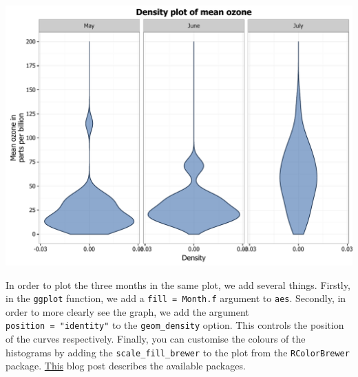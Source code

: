 \documentclass[]{article}
\begin{document}
\begin{center}\includegraphics{0_all_posts_pdf/density_15-1} \end{center}

In order to plot the three months in the same plot, we add several
things. Firstly, in the \texttt{ggplot} function, we add a
\texttt{fill\ =\ Month.f} argument to \texttt{aes}. Secondly, in order
to more clearly see the graph, we add the argument
\texttt{position\ =\ "identity"} to the \texttt{geom\_density} option.
This controls the position of the curves respectively. Finally, you can
customise the colours of the histograms by adding the
\texttt{scale\_fill\_brewer} to the plot from the \texttt{RColorBrewer}
package.
\href{http://moderndata.plot.ly/create-colorful-graphs-in-r-with-rcolorbrewer-and-plotly/}{This}
blog post describes the available packages.
\end{document}
